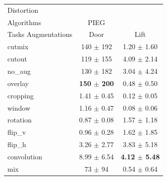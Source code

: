 \begin{tabular}{lcc}
Distortion & & \\
Algorithms & PIEG & \\
Tasks Augmentations & Door & Lift \\
cutmix          & 140 $\pm$ 192 & 1.20 $\pm$ 1.60 \\
cutout          & 119 $\pm$ 155 & 4.09 $\pm$ 2.14 \\
no\_aug         & 130 $\pm$ 182 & 3.04 $\pm$ 4.24 \\
overlay         & \textbf{150 $\pm$ 200} & 0.48 $\pm$ 0.50 \\
cropping        & 1.41 $\pm$ 0.45 & 0.12 $\pm$ 0.05 \\
window          & 1.16 $\pm$ 0.47 & 0.08 $\pm$ 0.06 \\
rotation        & 0.87 $\pm$ 0.08 & 1.57 $\pm$ 1.18 \\
flip\_v         & 0.96 $\pm$ 0.28 & 1.62 $\pm$ 1.85 \\
flip\_h         & 3.26 $\pm$ 2.77 & 3.83 $\pm$ 5.18 \\
convolution     & 8.99 $\pm$ 6.54 & \textbf{4.12 $\pm$ 5.48} \\
mix             & 73 $\pm$ 94 & 0.54 $\pm$ 0.64 \\
\end{tabular}
